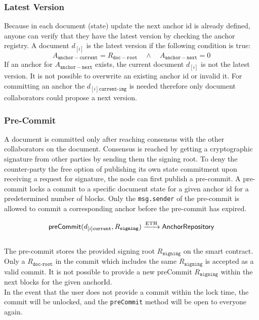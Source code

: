 \subsubsection{Latest Version}
Because in each document (state) update the next anchor id is already defined, anyone can verify that they have the latest version by checking the anchor registry. A document $d_{[i]}$ is the latest version if the following condition is true:
\begin{equation}
A_{\mathtt{anchor-current}} = R_{\mathtt{doc-root}} \quad \wedge \quad A_{\mathtt{anchor-next}} = 0
\end{equation}
If an anchor for $A_{\mathtt{anchor-next}}$ exists, the current document $d_{[i]}$ is not the latest version. It is not possible to overwrite an existing anchor id or invalid it. For committing an anchor the $d_{[i]\texttt{current-img}}$ is needed therefore only document collaborators could propose a next version.

\subsubsection{Pre-Commit}
A document is committed only after reaching consensus with the other collaborators on the document. Consensus is reached by getting a cryptographic signature from other parties by sending them the signing root. To deny the counter-party the free option of publishing its own state commitment upon receiving a request for signature, the node can first publish a pre-commit.
A pre-commit locks a commit to a specific document state for a given anchor id for a predetermined number of blocks. Only the \texttt{msg.sender} of the pre-commit is allowed to commit a corresponding anchor before the pre-commit has expired.

\begin{equation}\\
    \mathsf{preCommit}(d_{[i]\texttt{current}},R_{\texttt{signing}}) \xrightarrow[]{\text{ETH}} \mathsf{AnchorRepository}
\end{equation}\\
The pre-commit stores the provided signing root $R_{\texttt{signing}}$ on the smart contract. Only a $R_{\texttt{doc-root}}$ in the commit which includes the same $R_{\texttt{signing}}$ is accepted as a valid commit. 
It is not possible to provide a new preCommit $R_{\texttt{signing}}$ within the next  blocks for the given anchorId.\\
In the event that the user does not provide a commit within the lock time, the commit will be unlocked, and the \texttt{preCommit} method will be open to everyone again.

